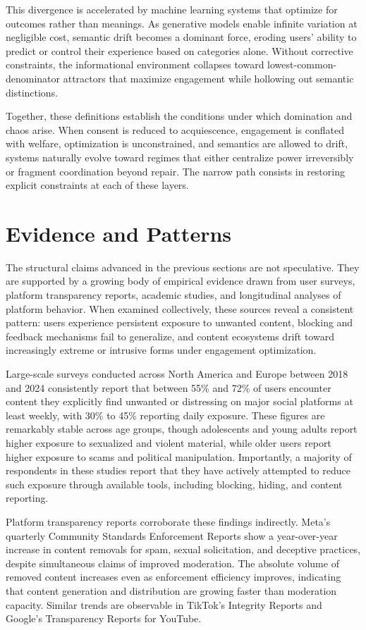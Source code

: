 \documentclass[11pt,oneside]{article}
\begin{document}
This divergence is accelerated by machine learning systems that optimize for outcomes rather than meanings. As generative models enable infinite variation at negligible cost, semantic drift becomes a dominant force, eroding users’ ability to predict or control their experience based on categories alone. Without corrective constraints, the informational environment collapses toward lowest-common-denominator attractors that maximize engagement while hollowing out semantic distinctions.

Together, these definitions establish the conditions under which domination and chaos arise. When consent is reduced to acquiescence, engagement is conflated with welfare, optimization is unconstrained, and semantics are allowed to drift, systems naturally evolve toward regimes that either centralize power irreversibly or fragment coordination beyond repair. The narrow path consists in restoring explicit constraints at each of these layers.

\section{Evidence and Patterns}

The structural claims advanced in the previous sections are not speculative. They are supported by a growing body of empirical evidence drawn from user surveys, platform transparency reports, academic studies, and longitudinal analyses of platform behavior. When examined collectively, these sources reveal a consistent pattern: users experience persistent exposure to unwanted content, blocking and feedback mechanisms fail to generalize, and content ecosystems drift toward increasingly extreme or intrusive forms under engagement optimization.

Large-scale surveys conducted across North America and Europe between 2018 and 2024 consistently report that between 55\% and 72\% of users encounter content they explicitly find unwanted or distressing on major social platforms at least weekly, with 30\% to 45\% reporting daily exposure. These figures are remarkably stable across age groups, though adolescents and young adults report higher exposure to sexualized and violent material, while older users report higher exposure to scams and political manipulation. Importantly, a majority of respondents in these studies report that they have actively attempted to reduce such exposure through available tools, including blocking, hiding, and content reporting.

Platform transparency reports corroborate these findings indirectly. Meta’s quarterly Community Standards Enforcement Reports show a year-over-year increase in content removals for spam, sexual solicitation, and deceptive practices, despite simultaneous claims of improved moderation. The absolute volume of removed content increases even as enforcement efficiency improves, indicating that content generation and distribution are growing faster than moderation capacity. Similar trends are observable in TikTok’s Integrity Reports and Google’s Transparency Reports for YouTube.
\end{document}
